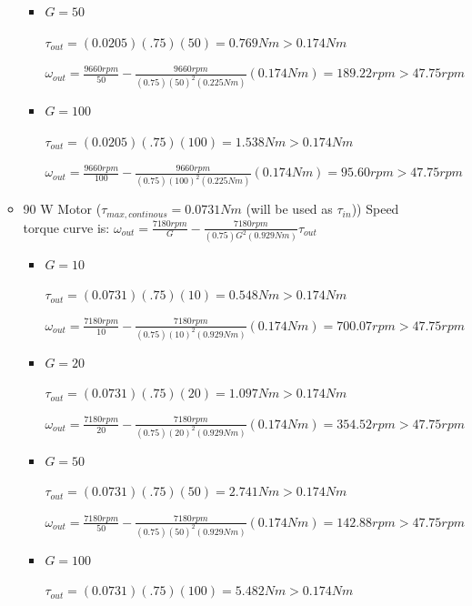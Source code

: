 \documentclass[12pt]{article}
\begin{document}
\begin{itemize}
\begin{itemize}
\begin{itemize}
            \item
            $G=50$

            $\tau_{out} = (0.0205) (.75) (50) = 0.769 Nm > 0.174 Nm$

            $\omega_{out} = \frac{9660rpm}{50} - \frac{9660rpm}{(0.75)(50)^2(0.225Nm)}(0.174Nm) = 189.22 rpm > 47.75 rpm$

            \item
            $G=100$

            $\tau_{out} = (0.0205) (.75) (100) = 1.538 Nm > 0.174 Nm$

            $\omega_{out} = \frac{9660rpm}{100} - \frac{9660rpm}{(0.75)(100)^2(0.225Nm)}(0.174Nm) = 95.60 rpm > 47.75 rpm$

        \end{itemize}

        \item 
        90 W Motor ($\tau_{max, continous} = 0.0731 Nm$ (will be used as $\tau_{in}$))
        Speed torque curve is: $\omega_{out} = \frac{7180rpm}{G} - \frac{7180rpm}{(0.75)G^2(0.929Nm)}\tau_{out}$
        \begin{itemize}
            \item
            $G=10$

            $\tau_{out} = (0.0731) (.75) (10) = 0.548 Nm > 0.174 Nm$

            $\omega_{out} = \frac{7180rpm}{10} - \frac{7180rpm}{(0.75)(10)^2(0.929Nm)}(0.174Nm) = 700.07 rpm > 47.75 rpm$

            \item
            $G=20$

            $\tau_{out} = (0.0731) (.75) (20) = 1.097 Nm > 0.174 Nm$

            $\omega_{out} = \frac{7180rpm}{20} - \frac{7180rpm}{(0.75)(20)^2(0.929Nm)}(0.174Nm) = 354.52 rpm > 47.75 rpm$

            \item
            $G=50$

            $\tau_{out} = (0.0731) (.75) (50) = 2.741 Nm > 0.174 Nm$

            $\omega_{out} = \frac{7180rpm}{50} - \frac{7180rpm}{(0.75)(50)^2(0.929Nm)}(0.174Nm) = 142.88 rpm > 47.75 rpm$

            \item
            $G=100$

            $\tau_{out} = (0.0731) (.75) (100) = 5.482 Nm > 0.174 Nm$


\end{itemize}
\end{itemize}
\end{itemize}
\end{document}
